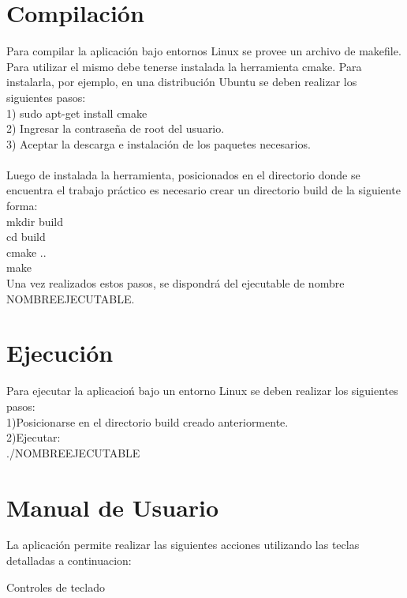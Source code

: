 \documentclass[11pt]{article}
\begin{document}
\section{Compilaci\'on}
  Para compilar la aplicaci\'on bajo entornos Linux se provee un archivo de makefile.
  Para utilizar el mismo debe tenerse instalada la herramienta cmake. Para instalarla, por ejemplo, en una distribuci\'on Ubuntu se deben 
realizar los siguientes pasos: \\

1) sudo apt-get install cmake \\
2) Ingresar la contrase\~na de root del usuario. \\
3) Aceptar la descarga e instalaci\'on de los paquetes necesarios. \\ \\

Luego de instalada la herramienta, posicionados en el directorio donde se encuentra el trabajo pr\'actico es necesario crear un directorio build
de la siguiente forma: \\
mkdir build \\
cd build \\
cmake .. \\
make \\

Una vez realizados estos pasos, se dispondr\'a del ejecutable de nombre NOMBREEJECUTABLE.

\section{Ejecuci\'on}

Para ejecutar la aplicacio\'n bajo un entorno Linux se deben realizar los siguientes pasos: \\
1)Posicionarse en el directorio build creado anteriormente. \\
2)Ejecutar: \\
./NOMBREEJECUTABLE 


\section{Manual de Usuario}

 La aplicaci\'on permite realizar las siguientes acciones utilizando las teclas detalladas a continuacion:


Controles de teclado \\
\end{document}
